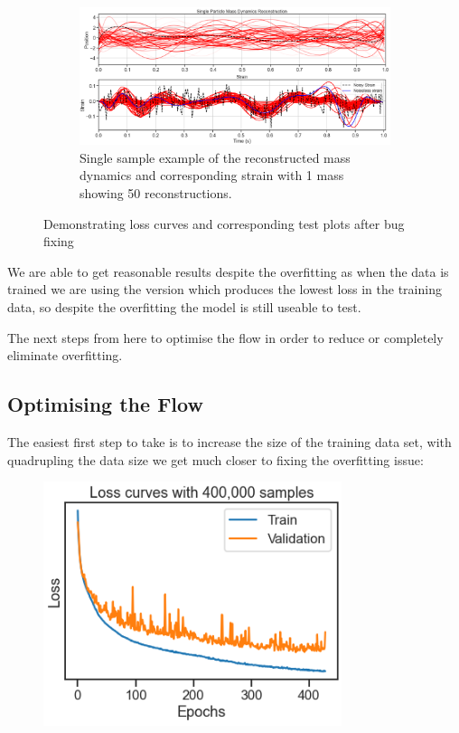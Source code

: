 \documentclass[a4paper, 12pt]{article}
\begin{document}
\begin{figure}[H]
\begin{subfigure}{.4\textwidth}
    \label{fig:massreccenter}
\end{subfigure} \hfill
\begin{subfigure}{.4\textwidth}
    \centering
    \includegraphics[width=1.1\textwidth, scale = 0.5]{superimpstrains.PNG}
    \caption{Single sample example of the reconstructed mass dynamics and corresponding strain with 1 mass showing 50 reconstructions.}
    \label{fig:massrec50center}
\end{subfigure}%
\centering
\caption{Demonstrating loss curves and corresponding test plots after bug fixing}

\end{figure}

We are able to get reasonable results despite the overfitting as when the data is trained we are using the version which produces the lowest loss in the training data, so despite the overfitting the model is still useable to test.

The next steps from here to optimise the flow in order to reduce or completely eliminate overfitting.

\subsection{Optimising the Flow}

The easiest first step to take is to increase the size of the training data set, with quadrupling the data size we get much closer to fixing the overfitting issue:

\begin{figure}[H]
  \includegraphics[scale = 0.8]{loss400k}
  \caption{}
  \label{}
\end{figure}
\end{document}

